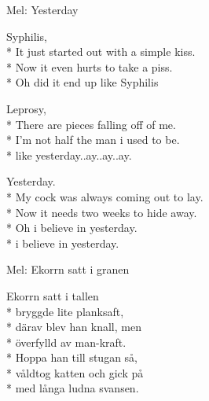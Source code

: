 \pagestyle{Barnförbjudet}
\begin{SongText}[Syphilis]
    \begin{SongInfo}
        Mel: Yesterday
    \end{SongInfo}
    \begin{SongVerse}
        Syphilis,\\*%
        It just started out with a simple kiss.\\*%
        Now it even hurts to take a piss.\\*%
        Oh did it end up like Syphilis
    \end{SongVerse}
    \begin{SongVerse}
        Leprosy,\\*%
        There are pieces falling off of me.\\*%
        I'm not half the man i used to be.\\*%
        like yesterday..ay..ay..ay.
    \end{SongVerse}
    \begin{SongVerse}
        Yesterday.\\*%
        My cock was always coming out to lay.\\*%
        Now it needs two weeks to hide away.\\*%
        Oh i believe in yesterday.\\*%
        i believe in yesterday.
    \end{SongVerse}
\end{SongText}
\begin{SongText}
    \begin{SongInfo}
        Mel: Ekorrn satt i granen
    \end{SongInfo}
    \begin{SongVerse}
        Ekorrn satt i tallen\\*%
        bryggde lite planksaft,\\*%
        därav blev han knall, men\\*%
        överfylld av man-kraft.\\*%
        Hoppa han till stugan så, \\*%
        våldtog katten och gick på\\*%
        med långa ludna svansen.
    \end{SongVerse}
\end{SongText}
